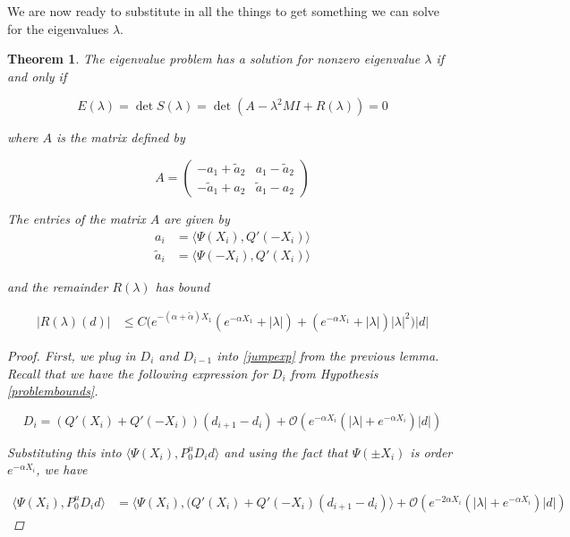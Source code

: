 \documentclass[12pt]{article}
\newtheorem{theorem}{Theorem}
\begin{document}
We are now ready to substitute in all the things to get something we can solve for the eigenvalues $\lambda$.

\begin{theorem}

The eigenvalue problem has a solution for nonzero eigenvalue $\lambda$ if and only if

\begin{equation}\label{matrixdet}
E(\lambda) = \det S(\lambda) = \det(A - \lambda^2 MI + R(\lambda) ) = 0
\end{equation}

where $A$ is the matrix defined by

\[
A = 
\begin{pmatrix}
-a_1 + \tilde{a}_2 & a_1 - \tilde{a}_2 \\
-\tilde{a}_1 + a_2 & \tilde{a}_1 - a_2 
\end{pmatrix}
\]

The entries of the matrix $A$ are given by
\begin{align*}
a_i &= \langle \Psi (X_i), Q'(-X_i) \rangle \\
\tilde{a}_i &= \langle \Psi(-X_i), Q'(X_i) \rangle
\end{align*}

and the remainder $R(\lambda)$ has bound

\begin{align*}
|R(\lambda)(d)| &\leq C \Big( e^{-(\alpha + \tilde{\alpha})X_1}( e^{-\alpha X_1} + |\lambda|  )  
+ (e^{-\alpha X_1} + |\lambda| ) |\lambda|^2 \Big) |d|
\end{align*}

\begin{proof}

First, we plug in $D_i$ and $D_{i-1}$ into \eqref{jumpexp} from the previous lemma. 
Recall that we have the following expression for $D_i$ from Hypothesis \ref{problembounds}.

\[
D_i = ( Q'(X_i) + Q'(-X_i))(d_{i+1} - d_i ) + \mathcal{O} \left( e^{-\alpha X_i} \left( |\lambda| +  e^{-\alpha X_i}  \right) |d| \right)
\]

Substituting this into $\langle \Psi(X_i), P^u_0 D_i d \rangle$ and using the fact that $\Psi(\pm X_i)$ is order $e^{-\alpha X_i}$, we have

\begin{align*}
\langle \Psi(X_i), P^u_0 D_i d \rangle &= \langle \Psi(X_i), (Q'(X_i) + Q'(-X_i)(d_{i+1} - d_i ) \rangle + \mathcal{O} \left( e^{-2 \alpha X_i} \left( |\lambda| +  e^{-\alpha X_i}  \right) |d| \right)
\end{align*}


\end{proof}
\end{theorem}
\end{document}
